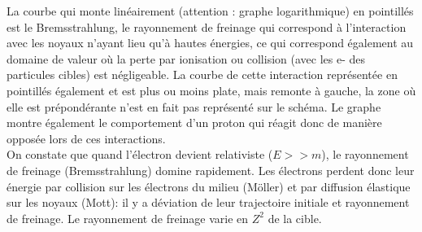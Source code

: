 La courbe qui monte linéairement (attention : graphe logarithmique) en pointillés est le Bremsstrahlung, le rayonnement de freinage qui correspond à l'interaction avec les noyaux n'ayant lieu qu'à hautes énergies, ce qui correspond également au domaine de valeur où la perte par ionisation ou collision (avec les e- des particules cibles) est négligeable. La courbe de cette interaction représentée en pointillés également et est plus ou moins plate, mais remonte à gauche, la zone où elle est prépondérante n'est en fait pas représenté sur le schéma. Le graphe montre également le comportement d'un proton qui réagit donc de manière opposée lors de ces interactions.\\
On constate que quand l'électron devient relativiste ($E>>m$), le rayonnement de freinage (Bremsstrahlung) domine rapidement. Les électrons perdent donc leur énergie par collision sur les électrons du milieu (Möller) et par diffusion élastique sur les noyaux (Mott): il y a déviation de leur trajectoire initiale et rayonnement de freinage. Le rayonnement de freinage varie en $Z^2$ de la cible.

